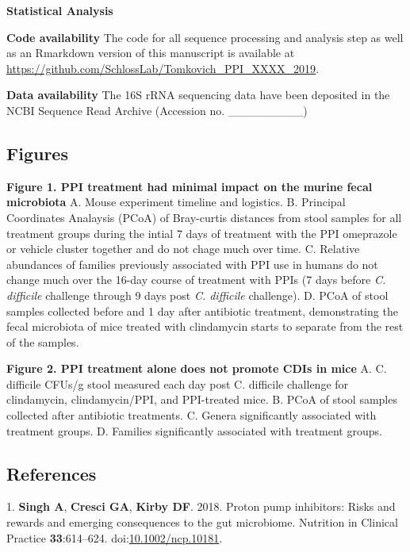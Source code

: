\documentclass[11pt,]{article}
\begin{document}
\textbf{Statistical Analysis}

\textbf{Code availability} The code for all sequence processing and
analysis step as well as an Rmarkdown version of this manuscript is
available at
\url{https://github.com/SchlossLab/Tomkovich_PPI_XXXX_2019}.

\textbf{Data availability} The 16S rRNA sequencing data have been
deposited in the NCBI Sequence Read Archive (Accession no.
\_\_\_\_\_\_\_\_\_)

\newpage

\subsection{Figures}\label{figures}

\textbf{Figure 1. PPI treatment had minimal impact on the murine fecal
microbiota} A. Mouse experiment timeline and logistics. B. Principal
Coordinates Analaysis (PCoA) of Bray-curtis distances from stool samples
for all treatment groups during the intial 7 days of treatment with the
PPI omeprazole or vehicle cluster together and do not chage much over
time. C. Relative abundances of families previously associated with PPI
use in humans do not change much over the 16-day course of treatment
with PPIs (7 days before \emph{C. difficile} challenge through 9 days
post \emph{C. difficile} challenge). D. PCoA of stool samples collected
before and 1 day after antibiotic treatment, demonstrating the fecal
microbiota of mice treated with clindamycin starts to separate from the
rest of the samples.

\textbf{Figure 2. PPI treatment alone does not promote CDIs in mice} A.
C. difficile CFUs/g stool measured each day post C. difficile challenge
for clindamycin, clindamycin/PPI, and PPI-treated mice. B. PCoA of stool
samples collected after antibiotic treatments. C. Genera significantly
associated with treatment groups. D. Families significantly associated
with treatment groups.

\newpage

\subsection*{References}\label{references}

\hypertarget{refs}{}
\hypertarget{ref-Singh2018}{}
1. \textbf{Singh A}, \textbf{Cresci GA}, \textbf{Kirby DF}. 2018. Proton
pump inhibitors: Risks and rewards and emerging consequences to the gut
microbiome. Nutrition in Clinical Practice \textbf{33}:614--624.
doi:\href{https://doi.org/10.1002/ncp.10181}{10.1002/ncp.10181}.
\end{document}
